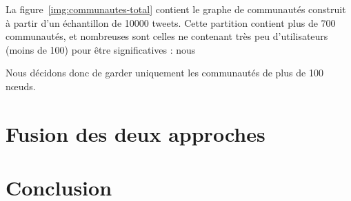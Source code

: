 \documentclass[a4paper]{article}
\newcommand{\figref}[1]{figure~\ref{#1}}
\begin{document}
La \figref{img:communautes-total} contient le graphe de communautés construit à
partir d'un échantillon de 10000 tweets. Cette partition contient plus de 700
communautés, et nombreuses sont celles ne contenant très peu d'utilisateurs
(moins de 100) pour être significatives : nous 

Nous décidons donc de garder uniquement les communautés de plus de 100 nœuds.




\newpage

\section{Fusion des deux approches}

\newpage

\section{Conclusion}

\printbibliography
\end{document}
